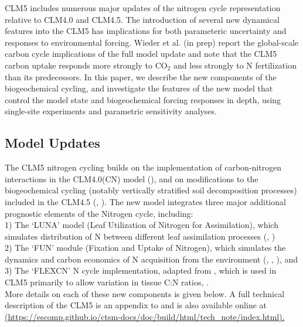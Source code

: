 \documentclass[draft,linenumbers]{agujournal}
\begin{document}
CLM5 includes numerous major updates of the nitrogen cycle representation relative to CLM4.0 and CLM4.5. The introduction of several new dynamical features into the CLM5 has implications for both parameteric uncertainty and responses to environmental forcing. Wieder et al. (in prep) report the global-scale carbon cycle implications of the full model update and note that the CLM5 carbon uptake responds more strongly to CO$_{2}$ and less strongly to N fertilization than its predecessors.  In this paper, we describe the new components of the biogeochemical cycling, and investigate the features of the new model that control the model state and biogeochemical forcing responses in depth, using single-site experiments and parametric sensitivity analyses. 

\subsection{Model Updates}

The CLM5 nitrogen cycling builds on the implementation of carbon-nitrogen interactions in the CLM4.0(CN) model (\cite{thornton2007}), and on modifications to the biogeochemical cycling (notably vertically stratified soil decomposition processes) included in the CLM4.5 (\cite{koven2013}, \cite{bonan2012}). The new model integrates three major additional prognostic elements of the Nitrogen cycle, including: \\

1) The `LUNA' model (Leaf Utilization of Nitrogen for Assimilation), which simulates distribution of N between different leaf assimilation processes (\cite{xu2012}, \cite{ali2016}) \\

2) The `FUN' module (Fixation and Uptake of Nitrogen), which simulates the dynamics and carbon economics of N acquisition from the environment (\cite{fisher2010fun}, \cite{brzostek2014}, \cite{shi2016}), and\\

3) The `FLEXCN' N cycle implementation, adapted from \cite{ghimire2016}, which is used in CLM5 primarily to allow variation in tissue C:N ratios,  .\\

More details on each of these new components is given below. A full technical description of the CLM5 is an appendix to \cite{lawrence2018} and is also available online at \url{(https://escomp.github.io/ctsm-docs/doc/build/html/tech_note/index.html).}
\end{document}
